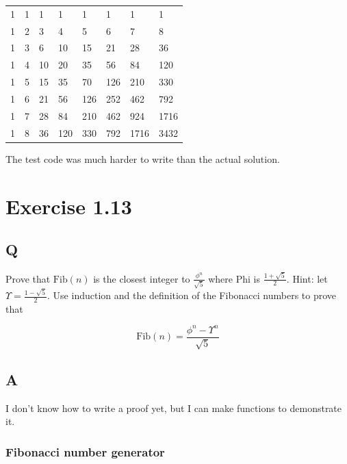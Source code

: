 \documentclass[
]{article}
\begin{document}
\begin{longtable}[]{@{}llllllll@{}}
\toprule
\endhead
1 & 1 & 1 & 1 & 1 & 1 & 1 & 1 \\
1 & 2 & 3 & 4 & 5 & 6 & 7 & 8 \\
1 & 3 & 6 & 10 & 15 & 21 & 28 & 36 \\
1 & 4 & 10 & 20 & 35 & 56 & 84 & 120 \\
1 & 5 & 15 & 35 & 70 & 126 & 210 & 330 \\
1 & 6 & 21 & 56 & 126 & 252 & 462 & 792 \\
1 & 7 & 28 & 84 & 210 & 462 & 924 & 1716 \\
1 & 8 & 36 & 120 & 330 & 792 & 1716 & 3432 \\
\bottomrule
\end{longtable}

The test code was much harder to write than the actual solution.

\hypertarget{exercise-1.13}{%
\section{Exercise 1.13}\label{exercise-1.13}}

\hypertarget{q-12}{%
\subsection{Q}\label{q-12}}

Prove that \(\text{Fib}(n)\) is the closest integer to
\(\frac{ϕ^n}{\sqrt{5}}\) where Phi is \(\frac{1 + \sqrt{5}}{2}\). Hint:
let \(Υ = \frac{1 - \sqrt{5}}{2}\). Use induction and the definition of
the Fibonacci numbers to prove that

\[
 \text{Fib}(n) = \frac{ϕ^n - Υ^n}{\sqrt{5}}
\]

\hypertarget{a-11}{%
\subsection{A}\label{a-11}}

I don't know how to write a proof yet, but I can make functions to
demonstrate it.

\hypertarget{fibonacci-number-generator}{%
\subsubsection{Fibonacci number
generator}\label{fibonacci-number-generator}}
\end{document}
